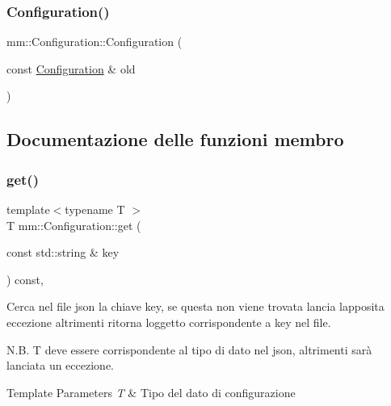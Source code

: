\subsubsection{\texorpdfstring{Configuration()}{Configuration()}}
{\footnotesize\ttfamily mm\+::\+Configuration\+::\+Configuration (\begin{DoxyParamCaption}\item[{const \hyperlink{classmm_1_1_configuration}{Configuration} \&}]{old }\end{DoxyParamCaption})\hspace{0.3cm}{\ttfamily [delete]}}



\subsection{Documentazione delle funzioni membro}
\mbox{\label{classmm_1_1_configuration_a30374c407050b9fb3f05dd3c2c01202d}} 
\subsubsection{\texorpdfstring{get()}{get()}}
{\footnotesize\ttfamily template$<$typename T $>$ \\
T mm\+::\+Configuration\+::get (\begin{DoxyParamCaption}\item[{const std\+::string \&}]{key }\end{DoxyParamCaption}) const\hspace{0.3cm}{\ttfamily [inline]}, {\ttfamily [noexcept]}}



Cerca nel file json la chiave {\ttfamily key}, se questa non viene trovata lancia l\textquotesingle{}apposita eccezione altrimenti ritorna l\textquotesingle{}oggetto corrispondente a {\ttfamily key} nel file. 

N.\+B. {\ttfamily T} deve essere corrispondente al tipo di dato nel json, altrimenti sarà lanciata un eccezione.


\begin{DoxyTemplParams}{Template Parameters}
{\em T} & Tipo del dato di configurazione \\
\hline
\end{DoxyTemplParams}

